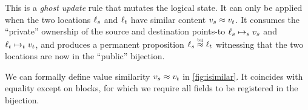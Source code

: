 \begin{mathpar}
\end{mathpar}
This is a \emph{ghost update} rule that mutates the logical state.
It can only be applied when the two locations $\datalangLoc_s$ and $\datalangLoc_t$ have similar content $\datalangVal_s \iSimilar \datalangVal_t$.
It consumes the ``private'' ownership of the source and destination points-to $\datalangLoc_s \iPointsto_s \datalangVal_s$ and $\datalangLoc_t \iPointsto_t \datalangVal_t$, and produces a permanent proposition $\datalangLoc_s \iInBij \datalangLoc_t$ witnessing that the two locations are now in the ``public'' bijection.

We can formally define value similarity $\datalangVal_s \iSimilar \datalangVal_t$ in \cref{fig:isimilar}.
It coincides with equality except on blocks, for which we require all fields to be registered in the bijection.



